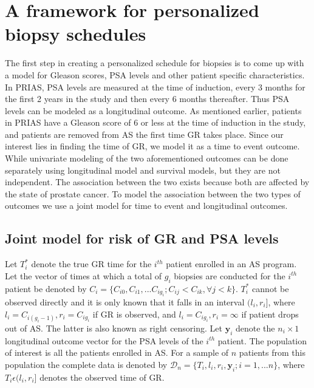 
\section{A framework for personalized biopsy schedules}
\label{sec : framework_pers_biop_sched}
The first step in creating a personalized schedule for biopsies is to come up with a model for Gleason scores, PSA levels and other patient specific characteristics. In PRIAS, PSA levels are measured at the time of induction, every 3 months for the first 2 years in the study and then every 6 months thereafter. Thus PSA levels can be modeled as a longitudinal outcome. As mentioned earlier, patients in PRIAS have a Gleason score of 6 or less at the time of induction in the study, and patients are removed from AS the first time GR takes place. Since our interest lies in finding the time of GR, we model it as a time to event outcome. While univariate modeling of the two aforementioned outcomes can be done separately using longitudinal model and survival models, but they are not independent. The association between the two exists because both are affected by the state of prostate cancer. To model the association between the two types of outcomes we use a joint model for time to event and longitudinal outcomes.

\subsection{Joint model for risk of GR and PSA levels}
\label{subsec : jm_definition}
Let $T_i^*$ denote the true GR time for the $i^{th}$ patient enrolled in an AS program. Let the vector of times at which a total of $g_i$ biopsies are conducted for the $i^{th}$ patient be denoted by $C_i = \{C_{i0}, C_{i1}, ... C_{ig_i}; C_{ij} < C_{ik}, \forall j<k \}$. $T_i^*$ cannot be observed directly and it is only known that it falls in an interval $(l_i, r_i]$, where $l_i = C_{i(g_i-1)}, r_i = C_{ig_i}$ if GR is observed, and $l_i = C_{ig_i}, r_i=\infty$ if patient drops out of AS. The latter is also known as right censoring. Let $\boldsymbol{y}_i$ denote the $n_i \times 1$ longitudinal outcome vector for the PSA levels of the $i^{th}$ patient. The population of interest is all the patients enrolled in AS. For a sample of $n$ patients from this population the complete data is denoted by $\mathcal{D}_n = \{T_i, l_i, r_i, \boldsymbol{y}_i; i = 1,...n\}$, where $T_i \epsilon (l_i, r_i]$ denotes the observed time of GR.\\

